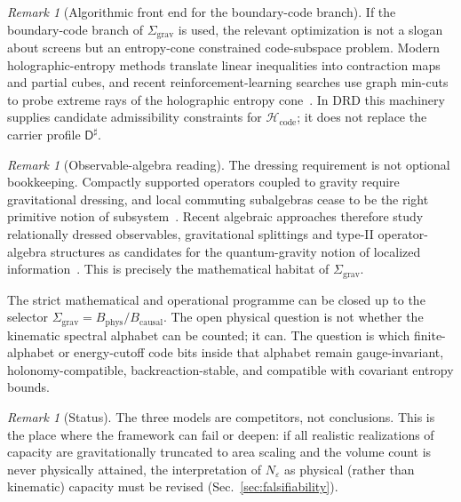 \documentclass[11pt,a4paper]{article}
\theoremstyle{definition}
\theoremstyle{remark}
\newtheorem{remark}[theorem]{Remark}
\newcommand{\Dsharp}{\mathsf{D}^{\sharp}}
\newcommand{\Bphys}{B_{\mathrm{phys}}}
\newcommand{\Bcausal}{B_{\mathrm{causal}}}
\begin{document}
\begin{remark}[Algorithmic front end for the boundary-code branch]
If the boundary-code branch of $\Sigma_{\mathrm{grav}}$ is used, the relevant optimization is
not a slogan about screens but an entropy-cone constrained code-subspace problem.  Modern
holographic-entropy methods translate linear inequalities into contraction maps and partial
cubes, and recent reinforcement-learning searches use graph min-cuts to probe extreme rays of
the holographic entropy cone~\cite{Bao2025,Bao2025Complete,HeLeeOoguri2026}.  In DRD this
machinery supplies candidate admissibility constraints for $\mathcal H_{\mathrm{code}}$; it
does not replace the carrier profile $\Dsharp$.
\end{remark}

\begin{remark}[Observable-algebra reading]
The dressing requirement is not optional bookkeeping.  Compactly supported operators coupled
to gravity require gravitational dressing, and local commuting subalgebras cease to be the
right primitive notion of subsystem~\cite{DonnellyGiddings2016}.  Recent algebraic approaches
therefore study relationally dressed observables, gravitational splittings and type-II
operator-algebra structures as candidates for the quantum-gravity notion of localized
information~\cite{Giddings2025,AhmadJefferson2024,Faulkner2024}.  This is precisely the
mathematical habitat of $\Sigma_{\mathrm{grav}}$.
\end{remark}


\begin{tcolorbox}[colback=blue!3,colframe=blue!40!black,title=Central remaining physical node]
The strict mathematical and operational programme can be closed up to the selector
$\Sigma_{\mathrm{grav}}=\Bphys/\Bcausal$.  The open physical question is not whether the
kinematic spectral alphabet can be counted; it can.  The question is which finite-alphabet or
energy-cutoff code bits inside that alphabet remain gauge-invariant, holonomy-compatible,
backreaction-stable, and compatible with covariant entropy bounds.
\end{tcolorbox}

\begin{remark}[Status]
The three models are competitors, not conclusions.  This is the place where the framework can
fail or deepen: if all realistic realizations of capacity are gravitationally truncated to area
scaling and the volume count is never physically attained, the interpretation of
$N_{\varepsilon}$ as physical (rather than kinematic) capacity must be revised
(Sec.~\ref{sec:falsifiability}).
\end{remark}
\end{document}
